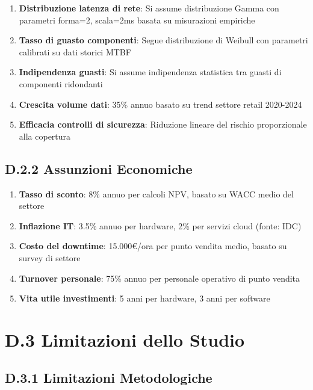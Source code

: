 \begin{enumerate}
    \item \textbf{Distribuzione latenza di rete}: Si assume distribuzione Gamma con parametri forma=2, scala=2ms basata su misurazioni empiriche
    \item \textbf{Tasso di guasto componenti}: Segue distribuzione di Weibull con parametri calibrati su dati storici MTBF
    \item \textbf{Indipendenza guasti}: Si assume indipendenza statistica tra guasti di componenti ridondanti
    \item \textbf{Crescita volume dati}: 35\% annuo basato su trend settore retail 2020-2024
    \item \textbf{Efficacia controlli di sicurezza}: Riduzione lineare del rischio proporzionale alla copertura
\end{enumerate}

\subsection{D.2.2 Assunzioni Economiche}

\begin{enumerate}
    \item \textbf{Tasso di sconto}: 8\% annuo per calcoli NPV, basato su WACC medio del settore
    \item \textbf{Inflazione IT}: 3.5\% annuo per hardware, 2\% per servizi cloud (fonte: IDC)
    \item \textbf{Costo del downtime}: 15.000€/ora per punto vendita medio, basato su survey di settore
    \item \textbf{Turnover personale}: 75\% annuo per personale operativo di punto vendita
    \item \textbf{Vita utile investimenti}: 5 anni per hardware, 3 anni per software
\end{enumerate}

\section{D.3 Limitazioni dello Studio}

\subsection{D.3.1 Limitazioni Metodologiche}

